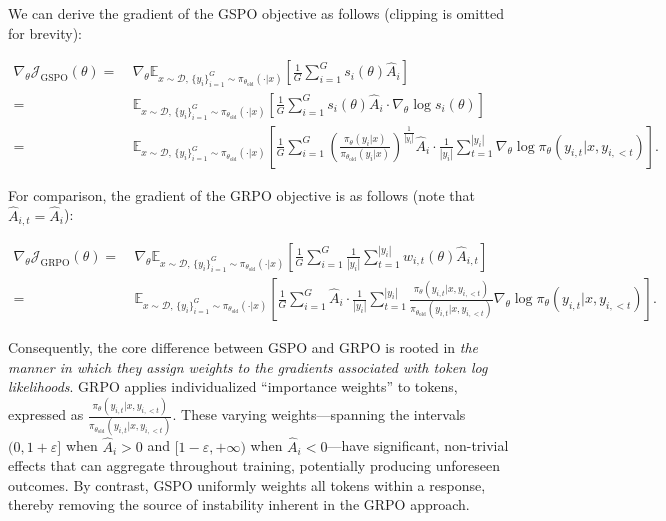 We can derive the gradient of the GSPO objective as follows (clipping is omitted for brevity):

\begin{align}
\nabla_{\theta} \mathcal{J}_\text{GSPO} (\theta)
=&\ 
\nabla_{\theta} \mathbb{E}_{ x \sim \mathcal{D},\, \{y_i\}_{i=1}^G \sim \pi_{\theta_\text{old}}( \cdot | x) }
\left[ 
\frac{1}{G} \sum_{i=1}^{G} s_{i}(\theta) \widehat{A}_{i}
\right] \\
= &\ 
\mathbb{E}_{ x \sim \mathcal{D},\, \{y_i\}_{i=1}^G \sim \pi_{\theta_\text{old}}( \cdot | x) }
\left[ 
\frac{1}{G} \sum_{i=1}^{G}
s_{i}(\theta) \widehat{A}_{i}
\cdot \nabla_{\theta} \log s_{i}(\theta)
\right] \\
=&\ 
\mathbb{E}_{ x \sim \mathcal{D},\, \{y_i\}_{i=1}^G \sim \pi_{\theta_\text{old}}( \cdot | x) }
\left[ 
\frac{1}{G} \sum_{i=1}^{G} 
\left( \frac{ \pi_{\theta} (y_i | x) }{ \pi_{\theta_\text{old}} (y_i | x)} \right)^{\frac{1}{|y_i|}} \widehat{A}_{i} 
\cdot \frac{1}{|y_i|} \sum_{t=1}^{|y_i|} \nabla_{\theta} \log \pi_{\theta} (y_{i,t} | x, y_{i,<t}) 
\right].
\label{equ:gspo_grad}
\end{align}

For comparison, the gradient of the GRPO objective is as follows (note that $\widehat{A}_{i,t} = \widehat{A}_{i}$):

\begin{align}
\nabla_{\theta} \mathcal{J}_\text{GRPO} (\theta) 
=&\ 
\nabla_{\theta} \mathbb{E}_{ x \sim \mathcal{D},\, \{y_i\}_{i=1}^G \sim \pi_{\theta_\text{old}}( \cdot | x) }
\left[ \frac{1}{G} \sum_{i=1}^{G} \frac{1}{|y_i|} \sum_{t=1}^{|y_i|} 
w_{i,t}(\theta) \widehat{A}_{i,t}
\right] \\
=&\
\mathbb{E}_{ x \sim \mathcal{D},\, \{y_i\}_{i=1}^G \sim \pi_{\theta_\text{old}}( \cdot | x) }
\left[ \frac{1}{G} \sum_{i=1}^{G} \widehat{A}_{i} 
\cdot \frac{1}{|y_i|} \sum_{t=1}^{|y_i|} 
\frac{ \pi_{\theta} (y_{i,t} | x, y_{i,<t}) }{ \pi_{\theta_\text{old}} (y_{i,t} | x,y_{i,<t})} 
\nabla_{\theta} \log \pi_{\theta} (y_{i,t} | x, y_{i,<t})  
\right].
\end{align}

Consequently, the core difference between GSPO and GRPO is rooted in \textit{the manner in which they assign weights to the gradients associated with token log likelihoods}. GRPO applies individualized ``importance weights'' to tokens, expressed as $\frac{ \pi_{\theta} (y_{i,t} | x, y_{i,<t}) }{ \pi_{\theta_\text{old}} (y_{i,t} | x,y_{i,<t})}$. These varying weights—spanning the intervals $(0, 1+\varepsilon]$ when $\widehat{A}_{i} >0$ and $[1-\varepsilon, +\infty)$ when $\widehat{A}_{i} < 0$—have significant, non-trivial effects that can aggregate throughout training, potentially producing unforeseen outcomes. By contrast, GSPO uniformly weights all tokens within a response, thereby removing the source of instability inherent in the GRPO approach.

